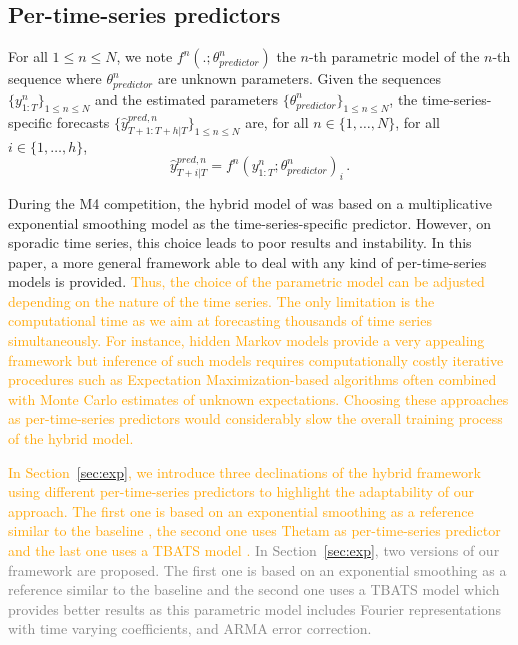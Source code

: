 \documentclass[10pt]{article} %
\newcommand{\ts}{y}
\newcommand{\tspred}{\widehat{\ts}}
\newcommand{\stat}{f}
\newcommand{\statparam}{\theta_{predictor}}
\newcommand{\lag}{h}
\begin{document}
\subsection{Per-time-series predictors}
For all $1\leqslant n \leqslant N$, we note $\stat^n(.;\statparam^n)$ the $n$-th parametric model of the $n$-th sequence where $\statparam^n$ are  unknown parameters. Given the sequences $\{\ts^n_{1:T}\}_{1\leqslant n \leqslant N}$ and the estimated  parameters $\{\statparam^n\}_{1\leqslant n \leqslant N}$, the time-series-specific forecasts $\{\tspred^{pred,n}_{T+1:T+\lag|T}\}_{1\leqslant n \leqslant N}$ are, for all $n \in \{1,\ldots,N\}$, for all $i \in \{1,\ldots,\lag\}$,
\begin{equation}
    \label{eq:predictors}
    \tspred^{pred,n}_{T+i|T} = \stat^n(\ts^n_{1:T};\statparam^n)_i\,.
\end{equation}

During the M4 competition, the hybrid model of \citet{smyl2020} was based on a multiplicative exponential smoothing model as the time-series-specific predictor. However, on sporadic time series, this choice leads to poor results and instability. In this paper, a more general framework able to deal with any kind of per-time-series models is provided. \textcolor{orange}{Thus, the choice of the parametric model can be adjusted depending on the nature of the time series. The only limitation is the computational time as we aim at forecasting thousands of time series simultaneously. For instance, hidden Markov models provide a very appealing framework but inference of such models requires computationally costly iterative procedures such as Expectation Maximization-based algorithms often combined with Monte Carlo estimates of unknown expectations. Choosing these approaches as per-time-series predictors would considerably slow the overall training process of the hybrid model.} 

\textcolor{orange}{In Section~\ref{sec:exp}, we introduce three declinations of the hybrid framework  using different per-time-series predictors to highlight the adaptability of our approach. The first one is based on an  exponential smoothing as a reference similar to the baseline \citet{smyl2020}, the second one uses Thetam as per-time-series predictor \citep{hyndman2020} and the last one uses a TBATS model \citep{alysha2011}.} \textcolor{gray}{In Section~\ref{sec:exp}, two versions of our framework are proposed. The first one is based on an  exponential smoothing as a reference similar to the baseline \citet{smyl2020} and the second one uses a TBATS model \citep{alysha2011} which provides better results as this parametric model includes  Fourier representations with time varying coefficients, and ARMA error correction.}
\end{document}
